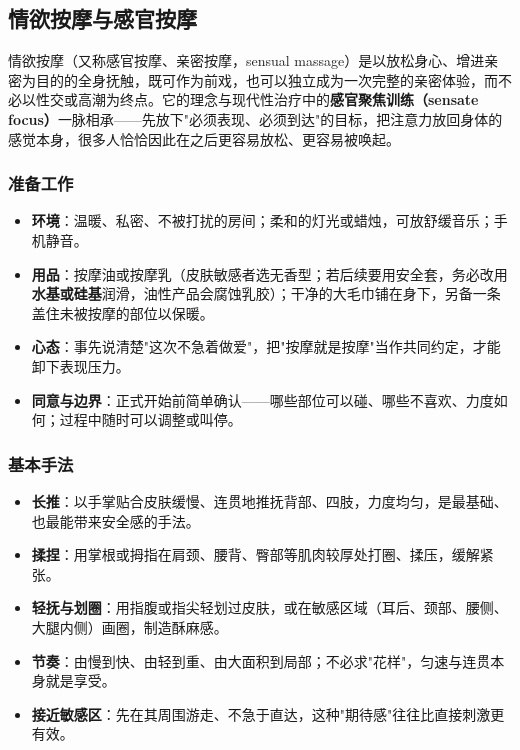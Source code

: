 \subsection{情欲按摩与感官按摩}

情欲按摩（又称感官按摩、亲密按摩，sensual massage）是以放松身心、增进亲密为目的的全身抚触，既可作为前戏，也可以独立成为一次完整的亲密体验，而不必以性交或高潮为终点。它的理念与现代性治疗中的\textbf{感官聚焦训练（sensate focus）}一脉相承——先放下"必须表现、必须到达"的目标，把注意力放回身体的感觉本身，很多人恰恰因此在之后更容易放松、更容易被唤起。

\subsubsection{准备工作}
\begin{itemize}
	\item \textbf{环境}：温暖、私密、不被打扰的房间；柔和的灯光或蜡烛，可放舒缓音乐；手机静音。
	\item \textbf{用品}：按摩油或按摩乳（皮肤敏感者选无香型；若后续要用安全套，务必改用\textbf{水基或硅基}润滑，油性产品会腐蚀乳胶）；干净的大毛巾铺在身下，另备一条盖住未被按摩的部位以保暖。
	\item \textbf{心态}：事先说清楚"这次不急着做爱"，把"按摩就是按摩"当作共同约定，才能卸下表现压力。
	\item \textbf{同意与边界}：正式开始前简单确认——哪些部位可以碰、哪些不喜欢、力度如何；过程中随时可以调整或叫停。
\end{itemize}

\subsubsection{基本手法}
\begin{itemize}
	\item \textbf{长推}：以手掌贴合皮肤缓慢、连贯地推抚背部、四肢，力度均匀，是最基础、也最能带来安全感的手法。
	\item \textbf{揉捏}：用掌根或拇指在肩颈、腰背、臀部等肌肉较厚处打圈、揉压，缓解紧张。
	\item \textbf{轻抚与划圈}：用指腹或指尖轻划过皮肤，或在敏感区域（耳后、颈部、腰侧、大腿内侧）画圈，制造酥麻感。
	\item \textbf{节奏}：由慢到快、由轻到重、由大面积到局部；不必求"花样"，匀速与连贯本身就是享受。
	\item \textbf{接近敏感区}：先在其周围游走、不急于直达，这种"期待感"往往比直接刺激更有效。
\end{itemize}

